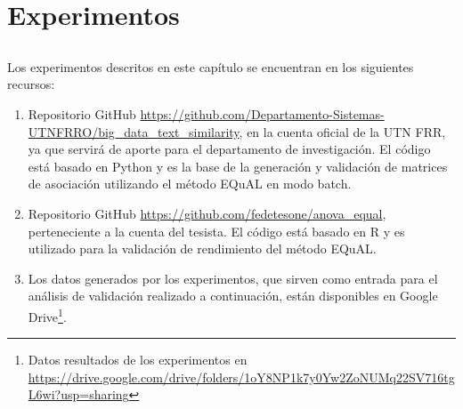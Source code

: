 \chapter*{Experimentos}\label{ch:experimentos}

\section*{}
\addtocounter{section}{1}
\setcounter{subsection}{0}

Los experimentos descritos en este capítulo se encuentran en los siguientes recursos:
\begin{enumerate}
	\item Repositorio GitHub \url{https://github.com/Departamento-Sistemas-UTNFRRO/big_data_text_similarity}, en la cuenta oficial de la UTN FRR, ya que servirá de aporte para el departamento de investigación. El código está basado en Python y es la base de la generación y validación de matrices de asociación utilizando el método EQuAL en modo batch.
	\item Repositorio GitHub \url{https://github.com/fedetesone/anova_equal}, perteneciente a la cuenta del tesista. El código está basado en R y es utilizado para la validación de rendimiento del método EQuAL.
	\item Los datos generados por los experimentos, que sirven como entrada para el análisis de validación realizado a continuación, están disponibles en Google Drive\footnote{Datos resultados de los experimentos en \url{https://drive.google.com/drive/folders/1oY8NP1k7y0Yw2ZoNUMq22SV716tgL6wi?usp=sharing}}.
\end{enumerate}






